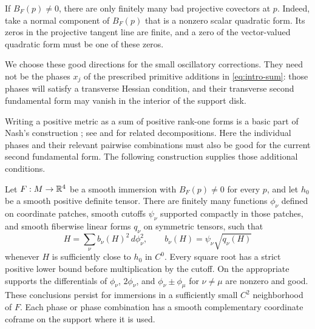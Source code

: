 If $B_F(p)\ne0$, there are only finitely many bad projective covectors at $p$.
Indeed, take a normal component of $B_F(p)$ that is a nonzero scalar quadratic
form. Its zeros in the projective tangent line are finite, and a zero of the
vector-valued quadratic form must be one of these zeros.

We choose these good directions for the small oscillatory corrections.
They need not be the phases $x_j$ of the prescribed primitive additions in
\eqref{eq:intro-sum}: those phases will satisfy a transverse Hessian
condition, and their transverse second fundamental form may vanish in the
interior of the support disk.

Writing a positive metric as a sum of positive rank-one forms is a basic
part of Nash's construction \cite{Nash1954}; see
\cite[\S3.5.4, p.~32 and footnote~30]{Gromov2015} and
\cite[Lemmas~2.2--2.3]{Kallen1978} for related decompositions.
Here the individual phases and their relevant pairwise combinations must
also be good for the current second fundamental form.  The following
construction supplies those additional conditions.

\begin{lemma}\label{lem:phase-data}
Let $F:M\to\mathbb{R}^4$ be a smooth immersion with $B_F(p)\ne0$ for every $p$, and let
$h_0$ be a smooth positive definite tensor. There are finitely many functions
$\phi_\nu$ defined on coordinate patches, smooth cutoffs $\psi_\nu$ supported
compactly in those patches, and smooth fiberwise linear forms $q_\nu$ on
symmetric tensors, such that
\begin{equation}\label{eq:phase-decomposition}
 H=\sum_\nu b_\nu(H)^2\,d\phi_\nu^2,
 \qquad b_\nu(H)=\psi_\nu\sqrt{q_\nu(H)}
\end{equation}
whenever $H$ is sufficiently close to $h_0$ in $C^0$. Every square root has a
strict positive lower bound before multiplication by the cutoff. On the
appropriate supports the differentials of $\phi_\nu$, $2\phi_\nu$, and
$\phi_\nu\pm\phi_\mu$ for $\nu\ne\mu$ are nonzero and good. These conclusions
persist for immersions in a sufficiently small $C^2$ neighborhood of $F$.
Each phase or phase combination has a smooth complementary coordinate
coframe on the support where it is used.
\end{lemma}


